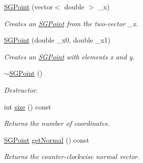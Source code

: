 \begin{DoxyCompactItemize}
\mbox{\label{classSGPoint_a4a93b7e7f5e705f599429756e4ffd592}} 
\hyperlink{classSGPoint_a4a93b7e7f5e705f599429756e4ffd592}{S\+G\+Point} (vector$<$ double $>$ \+\_\+x)
\begin{DoxyCompactList}\small\item\em Creates an \hyperlink{classSGPoint}{S\+G\+Point} from the two-\/vector \+\_\+x. \end{DoxyCompactList}\item 
\mbox{\label{classSGPoint_a47f9dc3888ee2dae455db20c65c69db4}} 
\hyperlink{classSGPoint_a47f9dc3888ee2dae455db20c65c69db4}{S\+G\+Point} (double \+\_\+x0, double \+\_\+x1)
\begin{DoxyCompactList}\small\item\em Creates an \hyperlink{classSGPoint}{S\+G\+Point} with elements x and y. \end{DoxyCompactList}\item 
\mbox{\label{classSGPoint_a327a92433f54b6c77e6e7a991d577557}} 
\hyperlink{classSGPoint_a327a92433f54b6c77e6e7a991d577557}{$\sim$\+S\+G\+Point} ()
\begin{DoxyCompactList}\small\item\em Destructor. \end{DoxyCompactList}\item 
\mbox{\label{classSGPoint_a97a04375aae1519d71234078d795bd7b}} 
int \hyperlink{classSGPoint_a97a04375aae1519d71234078d795bd7b}{size} () const
\begin{DoxyCompactList}\small\item\em Returns the number of coordinates. \end{DoxyCompactList}\item 
\mbox{\label{classSGPoint_a4dd851607359a1a7cbb4fc424b115dcf}} 
\hyperlink{classSGPoint}{S\+G\+Point} \hyperlink{classSGPoint_a4dd851607359a1a7cbb4fc424b115dcf}{get\+Normal} () const
\begin{DoxyCompactList}\small\item\em Returns the counter-\/clockwise normal vector. \end{DoxyCompactList}\item 
\mbox{\label{classSGPoint_ae8864088ce6a0665f0697423c0ea76f3}} 

\end{DoxyCompactItemize}
